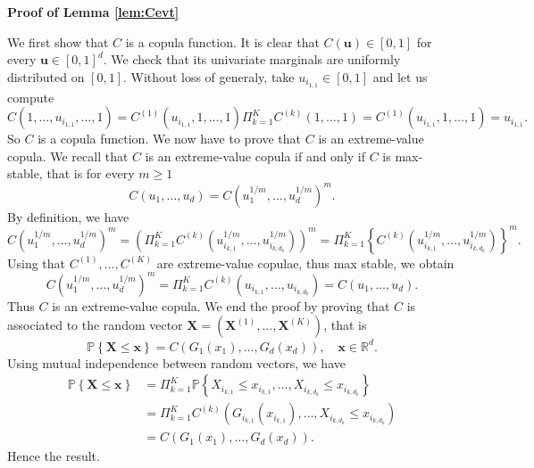 \documentclass[11pt]{article}
\makeatletter
\theoremstyle{definition}
\renewenvironment{proof}[1][\proofname]{\par
\pushQED{\qed}%
\normalfont \topsep6\p@\@plus6\p@\relax
\trivlist
\item\relax
{\textbf{
#1\@addpunct{ }}}\hspace\labelsep\ignorespaces
}{%
\popQED\endtrivlist\@endpefalse
}
\makeatother
\begin{document}
	\begin{proof}[Proof of Lemma \ref{lem:Cevt}]
		We first show that $C$ is a copula function. It is clear that $C(\textbf{u}) \in [0,1]$ for every $\textbf{u} \in [0,1]^d$. We check that its univariate marginals are uniformly distributed on $[0,1]$. Without loss of generaly, take $u_{i_{1,1}} \in [0,1]$ and let us compute 
		\begin{equation*}
			C(1, \dots, u_{i_{1,1}}, \dots, 1) = C^{(1)}(u_{i_{1,1}}, 1, \dots, 1) \Pi_{k=1}^K C^{(k)}(1,\dots,1) = C^{(1)}(u_{i_{1,1}}, 1, \dots, 1) = u_{i_{1,1}}.
		\end{equation*}
		So $C$ is a copula function. We now have to prove that $C$ is an extreme-value copula. We recall that $C$ is an extreme-value copula if and only if $C$ is max-stable, that is for every $m \geq 1$
		\begin{equation*}
			C(u_1,\dots, u_d) = C(u_1^{1/m}, \dots, u_d^{1/m})^m.
		\end{equation*}
		By definition, we have
		\begin{equation*}
			C(u_1^{1/m}, \dots, u_d^{1/m})^m = \left( \Pi_{k=1}^K C^{(k)}\left(u_{i_{k,1}}^{1/m}, \dots, u_{i_{k,d_k}}^{1/m}\right) \right)^m = \Pi_{k=1}^K  \left\{ C^{(k)}\left(u_{i_{k,1}}^{1/m}, \dots, u_{i_{k,d_k}}^{1/m}\right) \right\}^m.
		\end{equation*}
		Using that $C^{(1)}, \dots, C^{(K)}$ are extreme-value copulae, thus max stable, we obtain
		\begin{equation*}
			C(u_1^{1/m}, \dots, u_d^{1/m})^m = \Pi_{k=1}^K C^{(k)}\left(u_{i_{k,1}}, \dots, u_{i_{k,d_k}}\right) = C(u_1, \dots, u_d).
		\end{equation*}
		Thus $C$ is an extreme-value copula. We end the proof by proving that $C$ is associated to the random vector $\textbf{X} = (\textbf{X}^{(1)}, \dots, \textbf{X}^{(K)})$, that is
		\begin{equation*}
			\mathbb{P} \left\{ \textbf{X} \leq \textbf{x} \right\} = C(G_1(x_1), \dots, G_d(x_d)), \quad \textbf{x} \in \mathbb{R}^d.
		\end{equation*}
		Using mutual independence between random vectors, we have
		\begin{align*}
			\mathbb{P}\left\{ \textbf{X} \leq \textbf{x} \right\} &= \Pi_{k=1}^K \mathbb{P}\left\{ X_{i_{k,1}} \leq x_{i_{k,1}}, \dots, X_{i_{k,d_k}} \leq x_{i_{k,d_k}} \right\} \\ &= \Pi_{k=1}^K C^{(k)}\left(G_{i_{k,1}}(x_{i_{k,1}}), \dots, X_{i_{k,d_k}} \leq x_{i_{k,d_k}} \right) \\ &= C(G_1(x_1), \dots, G_d(x_d)).
		\end{align*}
		Hence the result.
	\end{proof}
	
\end{document}

